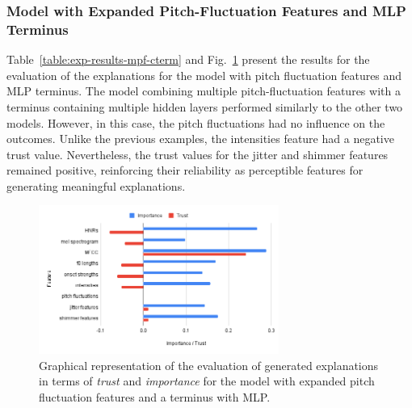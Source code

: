 \documentclass{article}
\begin{document}
\subsubsection{Model with Expanded Pitch-Fluctuation Features and MLP Terminus}
Table~\ref{table:exp-results-mpf-cterm} and Fig.~\ref{fig:exp_mpf_cterm} present the results for the evaluation of the explanations for the model with pitch fluctuation features and MLP terminus. The model combining multiple pitch-fluctuation features with a terminus containing multiple hidden layers performed similarly to the other two models. However, in this case, the pitch fluctuations had no influence on the outcomes. Unlike the previous examples, the intensities feature had a negative trust value. Nevertheless, the trust values for the jitter and shimmer features remained positive, reinforcing their reliability as perceptible features for generating meaningful explanations.
		\begin{figure}
			\centering
			\includegraphics[width=0.7\textwidth]{images/exp_mpf_cterm.png}
			\caption{Graphical representation of the evaluation of generated explanations in terms of \textit{trust} and \textit{importance} for the model with expanded pitch fluctuation features and a terminus with MLP.}
			\label{fig:exp_mpf_cterm}
		\end{figure}
\end{document}
